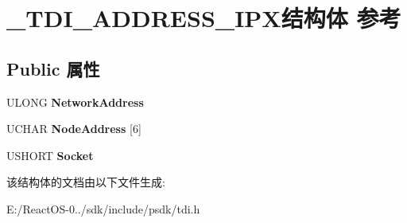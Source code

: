 \hypertarget{struct___t_d_i___a_d_d_r_e_s_s___i_p_x}{}\section{\+\_\+\+T\+D\+I\+\_\+\+A\+D\+D\+R\+E\+S\+S\+\_\+\+I\+P\+X结构体 参考}
\label{struct___t_d_i___a_d_d_r_e_s_s___i_p_x}
\subsection*{Public 属性}
\begin{DoxyCompactItemize}
\item 
\mbox{\label{struct___t_d_i___a_d_d_r_e_s_s___i_p_x_acd39f3f01def7b2c41bfa1bcb64fc300}} 
U\+L\+O\+NG {\bfseries Network\+Address}
\item 
\mbox{\label{struct___t_d_i___a_d_d_r_e_s_s___i_p_x_a846e5aafc5e4d39bfc820a32361a04aa}} 
U\+C\+H\+AR {\bfseries Node\+Address} \mbox{[}6\mbox{]}
\item 
\mbox{\label{struct___t_d_i___a_d_d_r_e_s_s___i_p_x_a8de9bd04ab173137b5e426af5f21db41}} 
U\+S\+H\+O\+RT {\bfseries Socket}
\end{DoxyCompactItemize}


该结构体的文档由以下文件生成\+:\begin{DoxyCompactItemize}
\item 
E\+:/\+React\+O\+S-\/0../sdk/include/psdk/tdi.\+h\end{DoxyCompactItemize}
